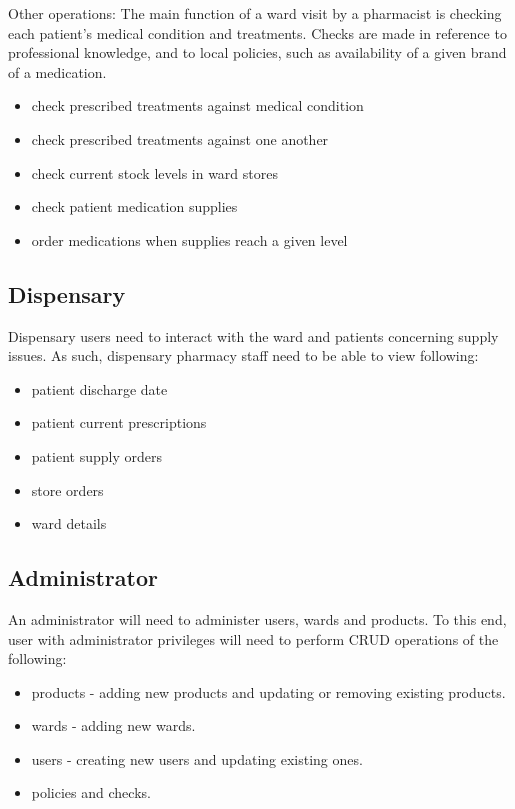 \documentclass[letterpaper]{amsart}
\begin{document}
Other operations:
The main function of a ward visit by a pharmacist is checking each patient's medical condition and treatments.  Checks are made in reference to professional knowledge, and to local policies, such as availability of a given brand of a medication.
\begin{itemize}
    \item check prescribed treatments against medical condition
    \item check prescribed treatments against one another
    \item check current stock levels in ward stores 
    \item check patient medication supplies 
    \item order medications when supplies reach a given level
\end{itemize}


\subsection{Dispensary}
Dispensary users need to interact with the ward and patients concerning supply issues.  As such, dispensary pharmacy staff need to be able to view following:
\begin{itemize} 
    \item patient discharge date 
    \item patient current prescriptions
    \item patient supply orders 
    \item store orders 
    \item ward details 
\end{itemize}

\subsection{Administrator}
An administrator will need to administer users, wards and products.  To this end, user with administrator privileges will need to perform CRUD operations of the following:
\begin{itemize}
    \item products - adding new products and updating or removing existing products.
    \item wards - adding new wards.
    \item users - creating new users and updating existing ones.
    \item policies and checks.
\end{itemize}
\end{document}
